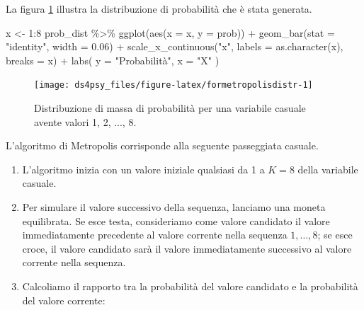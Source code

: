 \documentclass[
  11pt,
]{krantz}
\makeatletter
\newenvironment{Shaded}{\begin{snugshade}}{\end{snugshade}}
\newcommand{\AttributeTok}[1]{\textcolor[rgb]{0.61,0.61,0.61}{#1}}
\newcommand{\DecValTok}[1]{\textcolor[rgb]{0.06,0.06,0.06}{#1}}
\newcommand{\FloatTok}[1]{\textcolor[rgb]{0.06,0.06,0.06}{#1}}
\newcommand{\FunctionTok}[1]{\textcolor[rgb]{0,0,0}{#1}}
\newcommand{\NormalTok}[1]{#1}
\newcommand{\OtherTok}[1]{\textcolor[rgb]{0.37,0.37,0.37}{#1}}
\newcommand{\SpecialCharTok}[1]{\textcolor[rgb]{0,0,0}{#1}}
\newcommand{\StringTok}[1]{\textcolor[rgb]{0.5,0.5,0.5}{#1}}
\providecommand{\tightlist}{%
  \setlength{\itemsep}{0pt}\setlength{\parskip}{0pt}}
\newenvironment{kframe}{%
\medskip{}
\setlength{\fboxsep}{.8em}
 \def\at@end@of@kframe{}%
 \ifinner\ifhmode%
  \def\at@end@of@kframe{\end{minipage}}%
  \begin{minipage}{\columnwidth}%
 \fi\fi%
 \def\FrameCommand##1{\hskip\@totalleftmargin \hskip-\fboxsep
 \colorbox{shadecolor}{##1}\hskip-\fboxsep
     \hskip-\linewidth \hskip-\@totalleftmargin \hskip\columnwidth}%
 \MakeFramed {\advance\hsize-\width
   \@totalleftmargin\z@ \linewidth\hsize
   \@setminipage}}%
 {\par\unskip\endMakeFramed%
 \at@end@of@kframe}
\renewenvironment{Shaded}{\begin{kframe}}{\end{kframe}}
\theoremstyle{definition}
\theoremstyle{definition}
\theoremstyle{definition}
\theoremstyle{definition}
\theoremstyle{remark}
\makeatother
\begin{document}
La figura \ref{fig:formetropolisdistr} illustra la distribuzione di probabilità che è stata generata.

\begin{Shaded}
\begin{Highlighting}[]
\NormalTok{x }\OtherTok{\textless{}{-}} \DecValTok{1}\SpecialCharTok{:}\DecValTok{8}
\NormalTok{prob\_dist }\SpecialCharTok{\%\textgreater{}\%}
  \FunctionTok{ggplot}\NormalTok{(}\FunctionTok{aes}\NormalTok{(}\AttributeTok{x =}\NormalTok{ x, }\AttributeTok{y =}\NormalTok{ prob)) }\SpecialCharTok{+}
  \FunctionTok{geom\_bar}\NormalTok{(}\AttributeTok{stat =} \StringTok{"identity"}\NormalTok{, }\AttributeTok{width =} \FloatTok{0.06}\NormalTok{) }\SpecialCharTok{+}
  \FunctionTok{scale\_x\_continuous}\NormalTok{(}\StringTok{"x"}\NormalTok{, }\AttributeTok{labels =} \FunctionTok{as.character}\NormalTok{(x), }\AttributeTok{breaks =}\NormalTok{ x) }\SpecialCharTok{+}
  \FunctionTok{labs}\NormalTok{(}
    \AttributeTok{y =} \StringTok{"Probabilità"}\NormalTok{,}
    \AttributeTok{x =} \StringTok{"X"}
\NormalTok{  )}
\end{Highlighting}
\end{Shaded}

\begin{figure}[h]

{\centering \texttt{[image: ds4psy\_files/figure-latex/formetropolisdistr-1]} 

}

\caption{Distribuzione di massa di probabilità per una variabile casuale avente valori 1, 2, ..., 8.}\label{fig:formetropolisdistr}
\end{figure}

L'algoritmo di Metropolis corrisponde alla seguente passeggiata casuale.

\begin{enumerate}
\def\labelenumi{\arabic{enumi}.}
\tightlist
\item
  L'algoritmo inizia con un valore iniziale qualsiasi da 1 a \(K=8\) della variabile casuale.
\item
  Per simulare il valore successivo della sequenza, lanciamo una moneta equilibrata. Se esce testa, consideriamo come valore candidato il valore immediatamente precedente al valore corrente nella sequenza \(1, \dots, 8\); se esce croce, il valore candidato sarà il valore immediatamente successivo al valore corrente nella sequenza.
\item
  Calcoliamo il rapporto tra la probabilità del valore candidato e la probabilità del valore corrente:
\end{enumerate}
\end{document}
